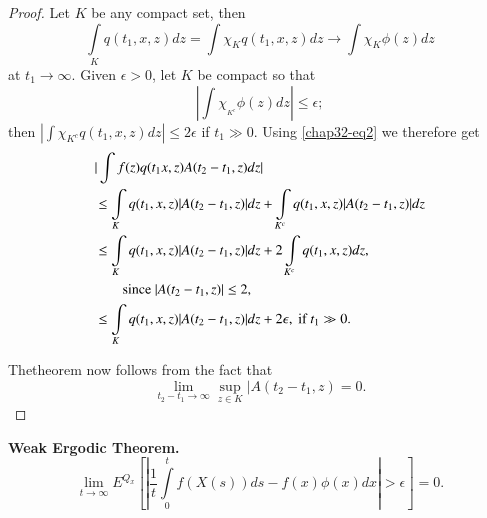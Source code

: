 \begin{proof}
Let $K$ be any compact set, then
$$
\int\limits_{K}q(t_{1},x,z)dz=\int\chi_{K}q(t_{1},x,z)dz\to \int
\chi_{K}\phi(z)dz 
$$
at $t_{1}\to \infty$. Given $\epsilon>0$, let $K$ be compact so that
$$
|\int \chi_{{}_{K^{c}}}\phi(z)dz|\leq \epsilon;
$$
then $|\int \chi_{K^{c}}q(t_{1},x,z)dz|\leq 2\epsilon$ if $t_{1}\gg
0$. Using \eqref{chap32-eq2} we therefore get
\begin{align*}
& |\int f(z)q(t_{1}x,z)A(t_{2}-t_{1},z)dz|\\
& \leq
  \int\limits_{K}q(t_{1},x,z)|A(t_{2}-t_{1},z)|dz+\int\limits_{K^{c}}q(t_{1},x,z)|A(t_{2}-t_{1},z)|dz\\ 
&\leq
  \int\limits_{K}q(t_{1},x,z)|A(t_{2}-t_{1},z)|dz+2\int\limits_{K^{c}}q(t_{1},x,z)dz,\\
&\qquad \text{since~ } |A(t_{2}-t_{1},z)|\leq 2,\\
&\leq
  \int\limits_{K}q(t_{1},x,z)|A(t_{2}-t_{1},z)|dz+2\epsilon,\text{~
    if~ } t_{1}\gg 0.
\end{align*}

The\pageoriginale theorem now follows from the fact that
$$
\lim\limits_{t_{2}-t_{1}\to \infty}\sup\limits_{z\in K}|A(t_{2}-t_{1},z)=0.
$$
\end{proof}

\noindent
{\bf Weak Ergodic Theorem.}
$$
\lim\limits_{t\to
  \infty}E^{Q_{x}}\left[|\frac{1}{t}\int\limits^{t}_{0}f(X(s))ds-f(x)\phi(x)dx|>\epsilon\right]=0. 
$$

